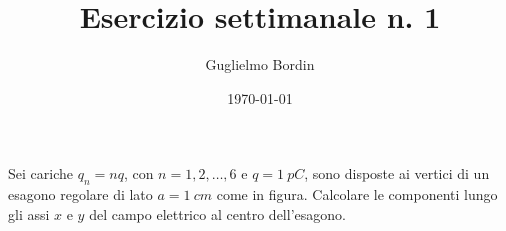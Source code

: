 \documentclass[10pt]{gulartcl}
\title{Esercizio settimanale n. 1}
\author{Guglielmo Bordin}
\date{\today}
\newcommand{\hexagon}{%
    \newdimen\side
    \side = 2cm
    \draw[dashed] (0:\side) \foreach \angle in {60, 120, ..., 360}{
        -- (\angle:\side)
    };
    \foreach \i/\pos in
        {1/right, 2/above, 3/above, 4/left, 5/below, 6/below}{
        \node[inner sep=1pt, circle, draw, fill, label={\pos:{$q_{\i}$}}]
            at ({60 * (\i - 1)}:\side) {};
    };}
\begin{document}
\maketitle

\noindent
Sei cariche $q_{n} = n q$, con $n = 1, 2, \dots, 6$ e $q = \qty{1}{pC}$,
sono disposte ai vertici di un esagono regolare di lato $a = \qty{1}{cm}$
come in figura. Calcolare le componenti lungo gli assi $x$ e $y$ del campo
elettrico al centro dell’esagono.

\bigbreak
\begin{center}
\end{center}
\end{document}
